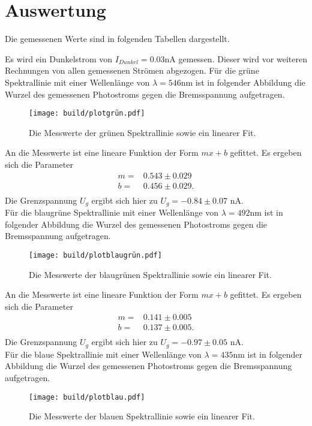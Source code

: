 \section{Auswertung}
\label{sec:Auswertung}
Die gemessenen Werte sind in folgenden Tabellen dargestellt.

Es wird ein Dunkelstrom von $I_{Dunkel} = 0.03 \si{\nano\ampere}$ gemessen.
Dieser wird vor weiteren Rechnungen von allen gemessenen Strömen abgezogen.
\noindent
Für die grüne Spektrallinie mit einer Wellenlänge von $\lambda = 546 \si{\nano\meter}$
ist in folgender Abbildung die Wurzel des gemessenen Photostroms gegen die Bremsspannung
aufgetragen.
\begin{figure}[H]
  \centering
  \texttt{[image: build/plotgrün.pdf]}
  \label{fig:plotgrün}
  \caption{Die Messwerte der grünen Spektrallinie sowie ein linearer Fit.}
\end{figure}
\noindent
An die Messwerte ist eine lineare Funktion der Form $mx +b$ gefittet. Es ergeben
sich die Parameter
\begin{align*}
  m = & 0.543 \pm 0.029 \\
  b = & 0.456 \pm 0.029. \\
\end{align*}
Die Grenzspannung $U_g$ ergibt sich hier zu $ U_g = -0.84 \pm 0.07$ \si{\nano\ampere}. \\
\noindent
Für die blaugrüne Spektrallinie mit einer Wellenlänge von $\lambda = 492 \si{\nano\meter}$
ist in folgender Abbildung die Wurzel des gemessenen Photostroms gegen die Bremsspannung
aufgetragen.
\begin{figure}[H]
  \centering
  \texttt{[image: build/plotblaugrün.pdf]}
  \label{fig:plotblaugrün}
  \caption{Die Messwerte der blaugrünen Spektrallinie sowie ein linearer Fit.}
\end{figure}
\noindent
An die Messwerte ist eine lineare Funktion der Form $mx +b$ gefittet. Es ergeben
sich die Parameter
\begin{align*}
  m = & 0.141 \pm 0.005 \\
  b = & 0.137 \pm 0.005.\\
\end{align*}
Die Grenzspannung $U_g$ ergibt sich hier zu $ U_g = -0.97 \pm 0.05$ \si{\nano\ampere}. \\
\noindent
Für die blaue Spektrallinie mit einer Wellenlänge von $\lambda = 435 \si{\nano\meter}$ \cite{AP02}
ist in folgender Abbildung die Wurzel des gemessenen Photostroms gegen die Bremsspannung
aufgetragen.
\begin{figure}[H]
  \centering
  \texttt{[image: build/plotblau.pdf]}
  \label{fig:plotblau}
  \caption{Die Messwerte der blauen Spektrallinie sowie ein linearer Fit.}
\end{figure}

